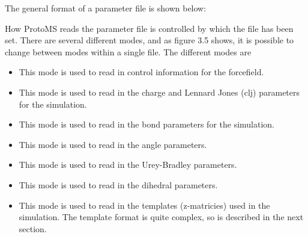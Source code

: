 \documentclass[letterpaper,10pt,english]{sphinxmanual}
\begin{document}
The general format of a parameter file is shown below:

%
\begin{sphinxVerbatim}[commandchars=\\\{\}]

 

 

 

                   

    

   
\end{sphinxVerbatim}

How ProtoMS reads the parameter file is controlled by which  the file has been set. There are several different modes, and as figure 3.5 shows, it is possible to change between modes within a single file. The different modes are
\begin{itemize}
\item {} 
 This mode is used to read in control information for the forcefield.

\item {} 
 This mode is used to read in the charge and Lennard Jones (clj) parameters for the simulation.

\item {} 
 This mode is used to read in the bond parameters for the simulation.

\item {} 
 This mode is used to read in the angle parameters.

\item {} 
 This mode is used to read in the Urey-Bradley parameters.

\item {} 
 This mode is used to read in the dihedral parameters.

\item {} 
 This mode is used to read in the templates (z-matricies) used in the simulation. The template format is quite complex, so is described in the next section.

\end{itemize}
\end{document}
